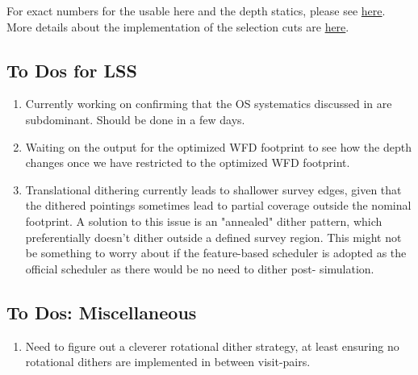 For exact numbers for the usable here and the depth statics, please see \href{https://github.com/LSSTDESC/ObsStrat/tree/static/static}{here}. More details about the implementation of the selection cuts are \href{https://github.com/LSSTDESC/ObsStrat/tree/static/static/depth\_cuts}{here}.

\subsection{To Dos for LSS}
\begin{enumerate}
\item Currently working on confirming that the OS systematics discussed in \citet{Awan+2016} are subdominant. Should be done in a few days.
\item Waiting on the  output for the optimized WFD footprint to see how the depth changes once we have restricted to the optimized WFD footprint.
\item Translational dithering currently leads to shallower survey edges, given that the dithered pointings sometimes lead to partial coverage outside the nominal footprint. A solution to this issue is an "annealed" dither pattern, which preferentially doesn't dither outside a defined survey region. This might not be something to worry about if the feature-based scheduler is adopted as the official scheduler as there would be no need to dither post- simulation.
\end{enumerate}

\subsection{To Dos: Miscellaneous}
\begin{enumerate}
\item Need to figure out a cleverer rotational dither strategy, at least ensuring no rotational dithers are implemented in between visit-pairs.
\end{enumerate}

 
